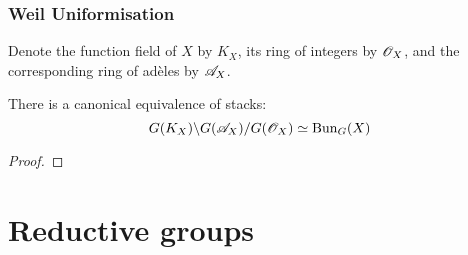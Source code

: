             \subsubsection{Weil Uniformisation}
                \begin{convention}
                    Denote the function field of $X$ by $K_X$, its ring of integers by $\mathscr{O}_X$, and the corresponding ring of ad\`eles by $\mathscr{A}_X$. 
                \end{convention}
                
                \begin{theorem} \label{theorem: weil_uniformisation}
                    There is a canonical equivalence of stacks:
                        $$G(K_X) \backslash G(\mathscr{A}_X) / G(\mathscr{O}_X) \simeq \mathrm{Bun}_G(X)$$
                \end{theorem}
                    \begin{proof}
                        
                    \end{proof}
    
    \section{Reductive groups}
